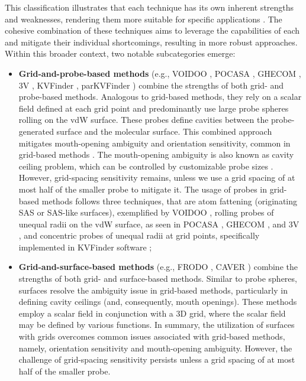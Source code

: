 \documentclass[Ingles]{phdthesis}
\def\eg{e.g.\onedot}
\begin{document}
This classification illustrates that each technique has its own inherent strengths and weaknesses, rendering them more suitable for specific applications \cite{simoes2017,guerra2020}. The cohesive combination of these techniques aims to leverage the capabilities of each and mitigate their individual shortcomings, resulting in more robust approaches. Within this broader context, two notable subcategories emerge:

\begin{itemize}
  \item \textbf{Grid-and-probe-based methods} (\eg, VOIDOO \cite{voidoo}, POCASA \cite{pocasa}, \acs{GHECOM} \cite{ghecom}, 3V \cite{3v}, KVFinder \cite{oliveira2014}, parKVFinder \cite{guerra2019,guerra2020}) combine the strengths of both grid- and probe-based methods. Analogous to grid-based methods, they rely on a scalar field defined at each grid point and predominantly use large probe spheres rolling on the \acs{vdW} surface. These probes define cavities between the probe-generated surface and the molecular surface. This combined approach mitigates mouth-opening ambiguity and orientation sensitivity, common in grid-based methods \cite{simoes2017}. The mouth-opening ambiguity is also known as cavity ceiling problem, which can be controlled by customizable probe sizes \cite{simoes2017,oliveira2014}. However, grid-spacing sensitivity remains, unless we use a grid spacing of at most half of the smaller probe to mitigate it. The usage of probes in grid-based methods follows three techniques, that are atom fattening (originating \acs{SAS} or \acs{SAS}-like surfaces), exemplified by VOIDOO \cite{voidoo}, rolling probes of unequal radii on the \acs{vdW} surface, as seen in POCASA \cite{pocasa}, \acs{GHECOM} \cite{ghecom}, and 3V \cite{3v}, and concentric probes of unequal radii at grid points, specifically implemented in KVFinder software \cite{oliveira2014};
  \item \textbf{Grid-and-surface-based methods} (\eg, FRODO \cite{frodo}, CAVER \cite{caver}) combine the strengths of both grid- and surface-based methods. Similar to probe spheres, surfaces resolve the ambiguity issue in grid-based methods, particularly in defining cavity ceilings (and, consequently, mouth openings). These methods employ a scalar field in conjunction with a \acs{3D} grid, where the scalar field may be defined by various functions. In summary, the utilization of surfaces with grids overcomes common issues associated with grid-based methods, namely, orientation sensitivity and mouth-opening ambiguity. However, the challenge of grid-spacing sensitivity persists unless a grid spacing of at most half of the smaller probe.
\end{itemize}
\end{document}
